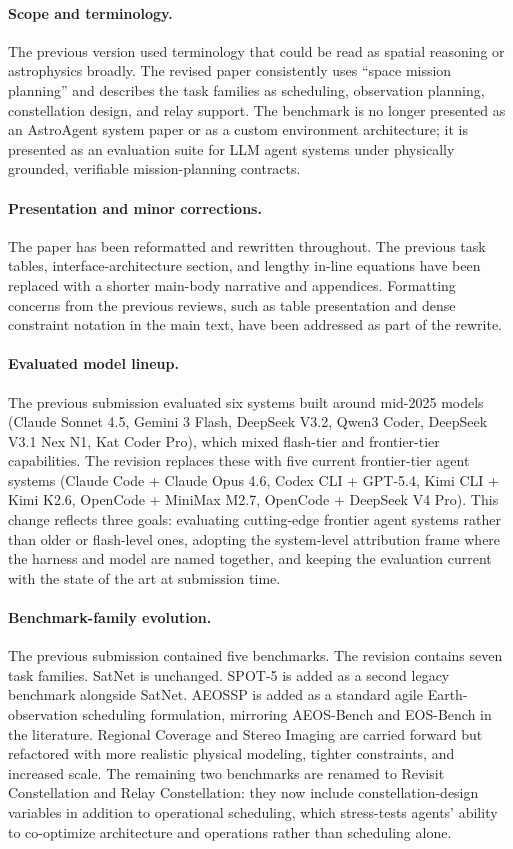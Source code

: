 \documentclass[11pt]{article}
\begin{document}
\paragraph{Scope and terminology.}
The previous version used terminology that could be read as spatial reasoning or astrophysics broadly. The revised paper consistently uses ``space mission planning'' and describes the task families as scheduling, observation planning, constellation design, and relay support. The benchmark is no longer presented as an AstroAgent system paper or as a custom environment architecture; it is presented as an evaluation suite for LLM agent systems under physically grounded, verifiable mission-planning contracts.

\paragraph{Presentation and minor corrections.}
The paper has been reformatted and rewritten throughout. The previous task tables, interface-architecture section, and lengthy in-line equations have been replaced with a shorter main-body narrative and appendices. Formatting concerns from the previous reviews, such as table presentation and dense constraint notation in the main text, have been addressed as part of the rewrite.

\paragraph{Evaluated model lineup.}
The previous submission evaluated six systems built around mid-2025 models (Claude Sonnet 4.5, Gemini 3 Flash, DeepSeek V3.2, Qwen3 Coder, DeepSeek V3.1 Nex N1, Kat Coder Pro), which mixed flash-tier and frontier-tier capabilities. The revision replaces these with five current frontier-tier agent systems (Claude Code + Claude Opus 4.6, Codex CLI + GPT-5.4, Kimi CLI + Kimi K2.6, OpenCode + MiniMax M2.7, OpenCode + DeepSeek V4 Pro). This change reflects three goals: evaluating cutting-edge frontier agent systems rather than older or flash-level ones, adopting the system-level attribution frame where the harness and model are named together, and keeping the evaluation current with the state of the art at submission time.

\paragraph{Benchmark-family evolution.}
The previous submission contained five benchmarks. The revision contains seven task families. SatNet is unchanged. SPOT-5 is added as a second legacy benchmark alongside SatNet. AEOSSP is added as a standard agile Earth-observation scheduling formulation, mirroring AEOS-Bench and EOS-Bench in the literature. Regional Coverage and Stereo Imaging are carried forward but refactored with more realistic physical modeling, tighter constraints, and increased scale. The remaining two benchmarks are renamed to Revisit Constellation and Relay Constellation: they now include constellation-design variables in addition to operational scheduling, which stress-tests agents' ability to co-optimize architecture and operations rather than scheduling alone.
\end{document}
